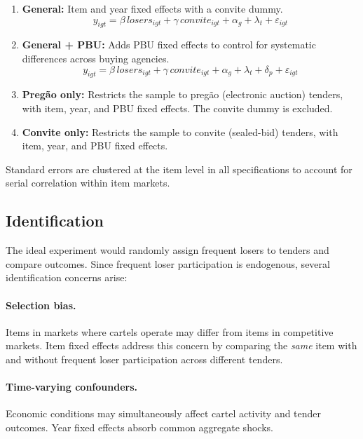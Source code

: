 \begin{enumerate}
  \item \textbf{General:} Item and year fixed effects with a convite dummy.
    \[ y_{igt} = \beta \, \textit{losers}_{igt} + \gamma \, \textit{convite}_{igt} + \alpha_g + \lambda_t + \varepsilon_{igt} \]

  \item \textbf{General + PBU:} Adds PBU fixed effects to control for systematic differences across buying agencies.
    \[ y_{igt} = \beta \, \textit{losers}_{igt} + \gamma \, \textit{convite}_{igt} + \alpha_g + \lambda_t + \delta_p + \varepsilon_{igt} \]

  \item \textbf{Preg\~{a}o only:} Restricts the sample to preg\~{a}o (electronic auction) tenders, with item, year, and PBU fixed effects. The convite dummy is excluded.

  \item \textbf{Convite only:} Restricts the sample to convite (sealed-bid) tenders, with item, year, and PBU fixed effects.
\end{enumerate}

Standard errors are clustered at the item level in all specifications to account for serial correlation within item markets.

\subsection{Identification}

The ideal experiment would randomly assign frequent losers to tenders and compare outcomes. Since frequent loser participation is endogenous, several identification concerns arise:

\paragraph{Selection bias.} Items in markets where cartels operate may differ from items in competitive markets. Item fixed effects address this concern by comparing the \emph{same} item with and without frequent loser participation across different tenders.

\paragraph{Time-varying confounders.} Economic conditions may simultaneously affect cartel activity and tender outcomes. Year fixed effects absorb common aggregate shocks.

